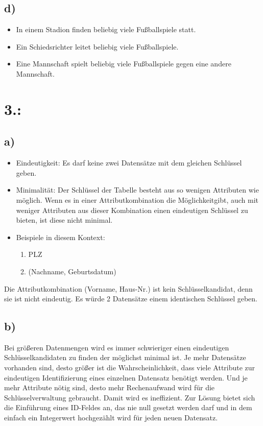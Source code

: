 \documentclass[a4paper,11pt,fleqn]{scrartcl}
\begin{document}
		\subsection*{d)}
			\begin{itemize}
				\item In einem Stadion finden beliebig viele Fußballspiele statt.
				\item Ein Schiedsrichter leitet beliebig viele Fußballspiele.
				\item Eine Mannschaft spielt beliebig viele Fußballspiele gegen eine andere Mannschaft.
			\end{itemize}


	\section*{3.:}

		\subsection*{a)}
			\begin{itemize}
				\item Eindeutigkeit: Es darf keine zwei Datensätze mit dem gleichen Schlüssel geben.
				\item Minimalität: Der Schlüssel der Tabelle besteht aus so wenigen Attributen wie möglich. Wenn es in einer 
				Attributkombination die Möglichkeitgibt, auch mit weniger Attributen aus dieser Kombination einen eindeutigen 
				Schlüssel zu bieten, ist diese nicht minimal.
				\item Beispiele in diesem Kontext:
				\begin{enumerate}
					\item PLZ
					\item (Nachname, Geburtsdatum)
				\end{enumerate}
			\end{itemize}
			Die Attributkombination (Vorname, Haus-Nr.) ist kein Schlüsselkandidat, denn sie ist nicht eindeutig. Es würde 2 
			Datensätze einem identischen Schlüssel geben.

		\subsection*{b)}
			Bei größeren Datenmengen wird es immer schwieriger einen eindeutigen Schlüsselkandidaten zu finden der möglichst 
			minimal ist. Je mehr Datensätze vorhanden sind, desto größer ist die Wahrscheinlichkeit, dass viele Attribute zur 
			eindeutigen Identifizierung eines einzelnen Datensatz benötigt werden. Und je mehr Attribute nötig sind, desto mehr 
			Rechenaufwand wird für die Schlüsselverwaltung gebraucht. Damit wird es ineffizient. Zur Lösung bietet sich die 
			Einführung eines ID-Feldes an, das nie null gesetzt werden darf und in dem einfach ein Integerwert hochgezählt wird 
			für jeden neuen Datensatz. 	
\end{document}
